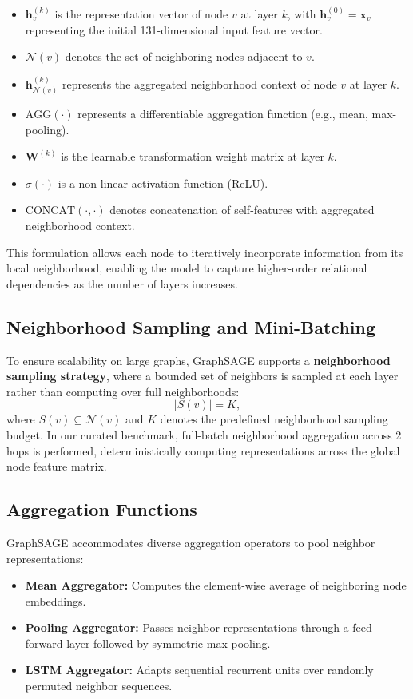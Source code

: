\documentclass[preprint,12pt]{elsarticle}
\begin{document}
\begin{itemize}
    \item $\mathbf{h}_v^{(k)}$ is the representation vector of node $v$ at layer $k$, with $\mathbf{h}_v^{(0)} = \mathbf{x}_v$ representing the initial 131-dimensional input feature vector.
    \item $\mathcal{N}(v)$ denotes the set of neighboring nodes adjacent to $v$.
    \item $\mathbf{h}_{\mathcal{N}(v)}^{(k)}$ represents the aggregated neighborhood context of node $v$ at layer $k$.
    \item $\mathrm{AGG}(\cdot)$ represents a differentiable aggregation function (e.g., mean, max-pooling).
    \item $\mathbf{W}^{(k)}$ is the learnable transformation weight matrix at layer $k$.
    \item $\sigma(\cdot)$ is a non-linear activation function (ReLU).
    \item $\mathrm{CONCAT}(\cdot, \cdot)$ denotes concatenation of self-features with aggregated neighborhood context.
\end{itemize}
This formulation allows each node to iteratively incorporate information from its local neighborhood, enabling the model to capture higher-order relational dependencies as the number of layers increases.

\subsection{Neighborhood Sampling and Mini-Batching}
To ensure scalability on large graphs, GraphSAGE supports a \textbf{neighborhood sampling strategy}, where a bounded set of neighbors is sampled at each layer rather than computing over full neighborhoods:
\begin{equation}
    |S(v)| = K,
\end{equation}
where $S(v) \subseteq \mathcal{N}(v)$ and $K$ denotes the predefined neighborhood sampling budget. In our curated benchmark, full-batch neighborhood aggregation across 2 hops is performed, deterministically computing representations across the global node feature matrix.

\subsection{Aggregation Functions}
GraphSAGE accommodates diverse aggregation operators to pool neighbor representations:
\begin{itemize}
    \item \textbf{Mean Aggregator:} Computes the element-wise average of neighboring node embeddings.
    \item \textbf{Pooling Aggregator:} Passes neighbor representations through a feed-forward layer followed by symmetric max-pooling.
    \item \textbf{LSTM Aggregator:} Adapts sequential recurrent units over randomly permuted neighbor sequences.
\end{itemize}
\end{document}
